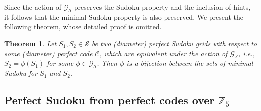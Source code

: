 \documentclass{article}
\newtheorem{theorem}{Theorem}[section]
\theoremstyle{definition}
\begin{document}
Since the action of $\mathcal{G}_\mathcal{S}$ preserves the Sudoku property and the inclusion of hints, it follows that the minimal Sudoku property is also preserved. We present the following theorem, whose detailed proof is omitted.

\begin{theorem}\label{eqSudoku}
Let $S_1, S_2 \in \mathcal{S}$ be two (diameter) perfect Sudoku grids with respect to some (diameter) perfect code $\mathcal{C}$, which are equivalent under the action of $\mathcal{G}_\mathcal{S}$, i.e., $S_2=\phi(S_1)$ for some $\phi\in\mathcal{G}_\mathcal{S}$. Then $\phi$ is a bijection between the sets of minimal Sudoku for $S_1$ and $S_2$.
\end{theorem}
	
	


\subsection{Perfect Sudoku from perfect codes over \texorpdfstring{$\mathbb{Z}_5$}{Z5}}
\end{document}

